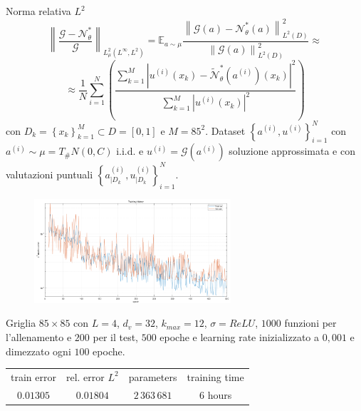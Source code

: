 \documentclass{beamer}
\begin{document}
\begin{frame}{Norma relativa $ L^2 $}
	\[ \left\| \frac{\mathcal{G} - \mathcal{N}^{*}_{\theta}}{\mathcal{G}}\right\|_{L_{\mu}^2(L^{\infty}, L^{2})} = 	\mathbb{E}_{a \sim \mu} \frac{\left\| \mathcal{G}(a) - \mathcal{N}^{*}_{\theta}(a) \right\|^{2}_{L^2(D)}}{\left\| \mathcal{G}(a)\right\|^{2}_{L^2(D)}} \approx \]
	\[\approx \frac1N \sum_{i=1}^{N}\left(  \frac{\sum_{k=1}^{M} \left| u^{(i)}\left( x_k\right)  - \widetilde{\mathcal{N}}^{*}_{\theta}\left(a^{(i)}\right)\left( x_k\right)  \right|^{2}}{\sum_{k=1}^{M}\left| u^{(i)}\left( x_k\right)  \right|^{2}}\right)	\]
	con $ D_k = \left\lbrace x_{k} \right\rbrace_{k = 1}^{M} \subset D = [0, 1]$ e $ M = 85^2 $. Dataset $ \left\lbrace a^{(i)}, u^{(i)} \right \rbrace_{i=1}^{N} $ con $ a^{(i)} \sim\mu = T_{\#}N(0, C) $ i.i.d. e $ u^{(i)} = \mathcal{G}(a^{(i)}) $ soluzione approssimata e con valutazioni puntuali $ \left\lbrace a^{(i)}_{|D_k}, u^{(i)}_{|D_k} \right \rbrace_{i=1}^{N} $.
\end{frame}

\begin{frame}
	\begin{figure}[h!!]
		\centering
		\includegraphics[width=0.65\textwidth]{DarcyFNO_L4_train.png}
	\end{figure}
	Griglia $ 85 \times 85 $ con $ L=4 $, $ d_v = 32 $, $ k_{max} = 12 $, $ \sigma = ReLU $, $ 1000 $ funzioni per l'allenamento e $ 200 $ per il test, $ 500 $ epoche e learning rate inizializzato a $ 0,001 $ e dimezzato ogni $ 100 $ epoche.
	\begin{table}[h!] %
		\centering
		\begin{tabular}{cccc}\toprule
			train error & rel. error $ L^2 $ & parameters & training time \\
			\cmidrule{1-4}
			$ 0.01305 $ & $ 0.01804 $ & $ 2 \, 363 \, 681  $ & $ 6 $ hours\\
			\bottomrule
		\end{tabular}
	\end{table}
\end{frame}
\end{document}
